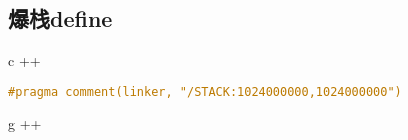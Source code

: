 \subsection{爆栈define}
c ++
    \begin{lstlisting}[language=c++]
#pragma comment(linker, "/STACK:1024000000,1024000000")
    \end{lstlisting}
g ++
    \begin{lstlisting}[language=c++]
    \end{lstlisting}
